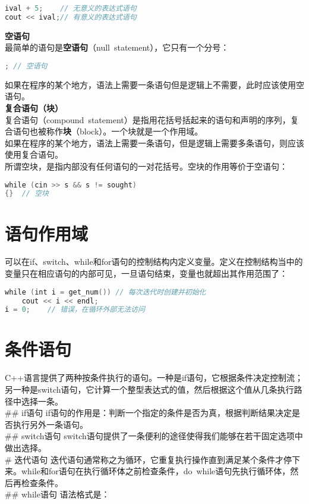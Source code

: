 \documentclass[
  a4paper,
  oneside,tablecaptionabove
]{scrbook}
\begin{document}
\begin{lstlisting}[language={C++}]
ival + 5;    // 无意义的表达式语句
cout << ival;// 有意义的表达式语句
\end{lstlisting}

\textbf{空语句}\\
最简单的语句是\textbf{空语句}（null~statement），它只有一个分号：

\begin{lstlisting}[language={C++}]
; // 空语句
\end{lstlisting}

如果在程序的某个地方，语法上需要一条语句但是逻辑上不需要，此时应该使用空语句。\\
\textbf{复合语句（块）}\\
复合语句（compound~statement）是指用花括号括起来的语句和声明的序列，复合语句也被称作\textbf{块}（block）。一个块就是一个作用域。\\
如果在程序的某个地方，语法上需要一条语句，但是逻辑上需要多条语句，则应该使用复合语句。\\
所谓空块，是指内部没有任何语句的一对花括号。空块的作用等价于空语句：

\begin{lstlisting}[language={C++}]
while (cin >> s && s != sought)
{}  // 空块
\end{lstlisting}

\chapter{语句作用域}\label{ux8bedux53e5ux4f5cux7528ux57df}

可以在if、switch、while和for语句的控制结构内定义变量。定义在控制结构当中的变量只在相应语句的内部可见，一旦语句结束，变量也就超出其作用范围了：

\begin{lstlisting}[language={C++}]
while (int i = get_num()) // 每次迭代时创建并初始化
    cout << i << endl;
i = 0;    // 错误，在循环外部无法访问
\end{lstlisting}

\chapter{条件语句}\label{ux6761ux4ef6ux8bedux53e5}

C++语言提供了两种按条件执行的语句。一种是if语句，它根据条件决定控制流；另一种是switch语句，它计算一个整型表达式的值，然后根据这个值从几条执行路径中选择一条。\\
\#\# if语句
if语句的作用是：判断一个指定的条件是否为真，根据判断结果决定是否执行另外一条语句。\\
\#\# switch语句
switch语句提供了一条便利的途径使得我们能够在若干固定选项中做出选择。\\
\# 迭代语句
迭代语句通常称之为循环，它重复执行操作直到满足某个条件才停下来。while和for语句在执行循环体之前检查条件，do~while语句先执行循环体，然后再检查条件。\\
\#\# while语句 语法格式是：
\end{document}
